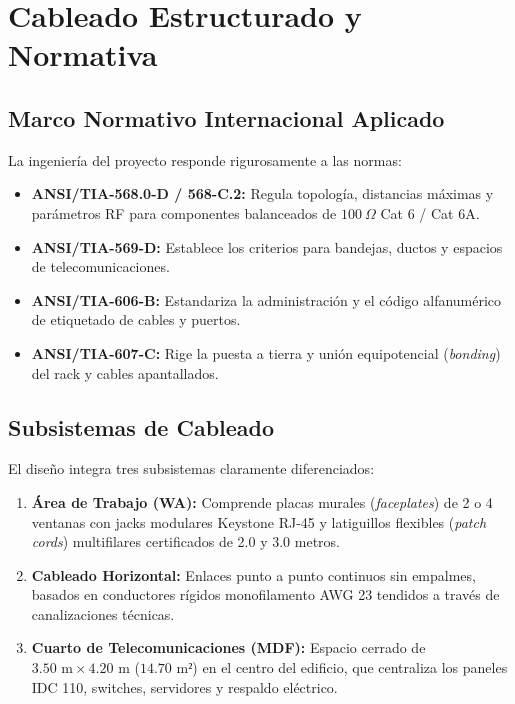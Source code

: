 \documentclass[11pt,a4paper]{article}
\begin{document}
\section{Cableado Estructurado y Normativa}

\subsection{Marco Normativo Internacional Aplicado}
La ingeniería del proyecto responde rigurosamente a las normas:
\begin{itemize}[noitemsep]
    \item \textbf{ANSI/TIA-568.0-D / 568-C.2:} Regula topología, distancias máximas y parámetros RF para componentes balanceados de $100\ \Omega$ Cat 6 / Cat 6A.
    \item \textbf{ANSI/TIA-569-D:} Establece los criterios para bandejas, ductos y espacios de telecomunicaciones.
    \item \textbf{ANSI/TIA-606-B:} Estandariza la administración y el código alfanumérico de etiquetado de cables y puertos.
    \item \textbf{ANSI/TIA-607-C:} Rige la puesta a tierra y unión equipotencial (\textit{bonding}) del rack y cables apantallados.
\end{itemize}

\subsection{Subsistemas de Cableado}
El diseño integra tres subsistemas claramente diferenciados:
\begin{enumerate}[noitemsep]
    \item \textbf{Área de Trabajo (WA):} Comprende placas murales (\textit{faceplates}) de 2 o 4 ventanas con jacks modulares Keystone RJ-45 y latiguillos flexibles (\textit{patch cords}) multifilares certificados de 2.0 y 3.0 metros.
    \item \textbf{Cableado Horizontal:} Enlaces punto a punto continuos sin empalmes, basados en conductores rígidos monofilamento AWG 23 tendidos a través de canalizaciones técnicas.
    \item \textbf{Cuarto de Telecomunicaciones (MDF):} Espacio cerrado de $3.50\text{ m} \times 4.20\text{ m}$ ($14.70\text{ m²}$) en el centro del edificio, que centraliza los paneles IDC 110, switches, servidores y respaldo eléctrico.
\end{enumerate}
\end{document}
